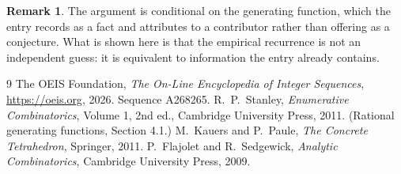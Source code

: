 \documentclass[11pt,a4paper]{article}
\theoremstyle{plain}
\theoremstyle{definition}
\newtheorem{remark}[theorem]{Remark}
\begin{document}
\begin{remark}
The argument is conditional on the generating function, which the entry records as a fact and
attributes to a contributor rather than offering as a conjecture. What is shown here is that
the empirical recurrence is not an independent guess: it is equivalent to information the
entry already contains.
\end{remark}

\begin{thebibliography}{9}
 The OEIS Foundation, \emph{The On-Line Encyclopedia of Integer
Sequences}, \url{https://oeis.org}, 2026. Sequence A268265.
 R.~P.~Stanley, \emph{Enumerative Combinatorics}, Volume 1, 2nd ed.,
Cambridge University Press, 2011. (Rational generating functions, Section 4.1.)
 M.~Kauers and P.~Paule, \emph{The Concrete Tetrahedron}, Springer, 2011.
 P.~Flajolet and R.~Sedgewick, \emph{Analytic Combinatorics}, Cambridge
University Press, 2009.
\end{thebibliography}
\end{document}
